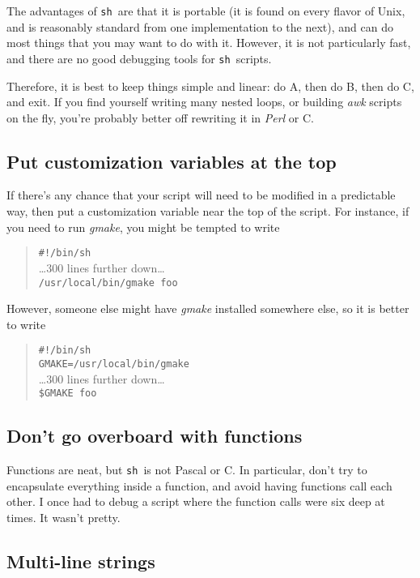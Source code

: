 \documentclass{article}
\newcommand{\fname}[1]{\textsl{#1}}
\newcommand{\code}[1]{\texttt{#1}}
\newcommand{\sh}{\code{sh}}
\begin{document}
	The advantages of \sh\ are that it is portable (it is found on
every flavor of Unix, and is reasonably standard from one
implementation to the next), and can do most things that you may want
to do with it. However, it is not particularly fast, and there are no
good debugging tools for \sh\ scripts.

	Therefore, it is best to keep things simple and linear: do A,
then do B, then do C, and exit. If you find yourself writing many
nested loops, or building \fname{awk} scripts on the fly, you're
probably better off rewriting it in \fname{Perl} or C.

\subsection{Put customization variables at the top}

	If there's any chance that your script will need to be
modified in a predictable way, then put a customization variable near
the top of the script. For instance, if you need to run \fname{gmake},
you might be tempted to write
\begin{quote}
\code{\#!/bin/sh}\\
\ldots300 lines further down\ldots\\
\code{/usr/local/bin/gmake foo}
\end{quote}
However, someone else might have \fname{gmake} installed somewhere
else, so it is better to write
\begin{quote}
\code{\#!/bin/sh}\\
\code{GMAKE=/usr/local/bin/gmake}\\
\ldots300 lines further down\ldots\\
\code{\$GMAKE foo}
\end{quote}

\subsection{Don't go overboard with functions}

	Functions are neat, but \sh\ is not Pascal or C. In
particular, don't try to encapsulate everything inside a function, and
avoid having functions call each other. I once had to debug a script
where the function calls were six deep at times. It wasn't pretty.

\subsection{Multi-line strings}
\end{document}
